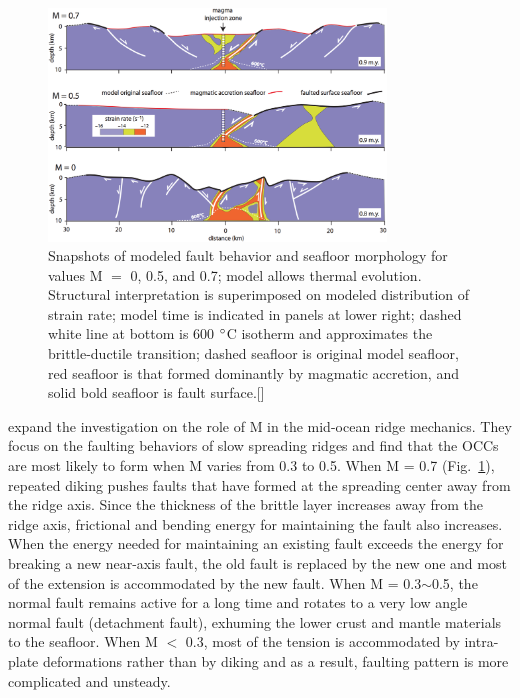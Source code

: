 \begin{figure}[h]
 \centering
  \includegraphics[width=0.8\textwidth]{./Figures/fig_Intro_Tucholke2008.eps}
 \caption{Snapshots of modeled fault behavior and seafloor morphology for values M $=$ 0, 0.5, and 0.7; model allows thermal evolution. Structural interpretation is superimposed on modeled distribution of strain rate; model time is indicated in panels at lower right; dashed white line at bottom is 600 $\degree$C isotherm and approximates the brittle-ductile transition; dashed seafloor is original model seafloor, red seafloor is that formed dominantly by magmatic accretion, and solid bold seafloor is fault surface.[\citealp{Tucholke2008,Whitney2012}]}
 \label{fig_Intro6_1}
\end{figure}

\citet{Tucholke2008} expand the investigation on the role of M in the mid-ocean ridge mechanics. They focus on the faulting behaviors of slow spreading ridges and find that the OCCs are most likely to form when M varies from 0.3 to 0.5. When M = 0.7 (Fig.~\ref{fig_Intro6_1}), repeated diking pushes faults that have formed at the spreading center away from the ridge axis. Since the thickness of the brittle layer increases away from the ridge axis, frictional and bending energy for maintaining the fault also increases. When the energy needed for maintaining an existing fault exceeds the energy for breaking a new near-axis fault, the old fault is replaced by the new one and most of the extension is accommodated by the new fault. When M = 0.3$\sim$0.5, the normal fault remains active for a long time and rotates to a very low angle normal fault (detachment fault), exhuming the lower crust and mantle materials to the seafloor. When M $<$ 0.3, most of the tension is accommodated by intra-plate deformations rather than by diking and as a result, faulting pattern is more complicated and unsteady.

